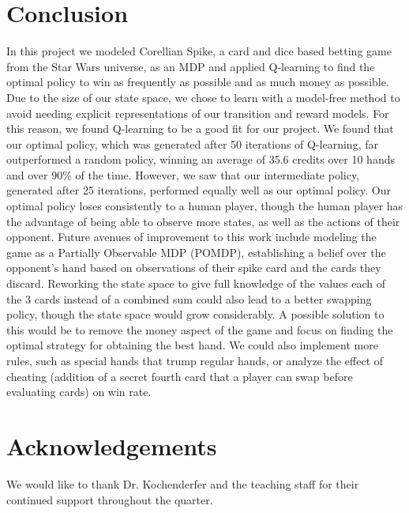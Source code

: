 \documentclass{article}
\begin{document}
\section{Conclusion}
In this project we modeled Corellian Spike, a card and dice based betting game from the Star Wars universe, as an MDP and applied Q-learning to find the optimal policy to win as frequently as possible and as much money as possible. 
Due to the size of our state space, we chose to learn with a model-free method to avoid needing explicit representations of our transition and reward models. For this reason, we found Q-learning to be a good fit for our project. 
We found that our optimal policy, which was generated after 50 iterations of Q-learning, far outperformed a random policy, winning  an average of 35.6 credits over 10 hands and over 90\% of the time. However, we saw that our intermediate policy, generated after 25 iterations, performed equally well as our optimal policy. Our optimal policy loses consistently to a human player, though the human player has the advantage of being able to observe more states, as well as the actions of their opponent.
Future avenues of improvement to this work include modeling the game as a Partially Observable MDP (POMDP), establishing a belief over the opponent's hand based on observations of their spike card and the cards they discard. Reworking the state space to give full knowledge of the values each of the 3 cards instead of a combined sum could also lead to a better swapping policy, though the state space would grow considerably. A possible solution to this would be to remove the money aspect of the game and focus on finding the optimal strategy for obtaining the best hand. We could also implement more rules, such as special hands that trump regular hands, or analyze the effect of cheating (addition of a secret fourth card that a player can swap before evaluating cards) on win rate.
\section*{Acknowledgements}
We would like to thank Dr. Kochenderfer and the teaching staff for their continued support throughout the quarter.
\end{document}
